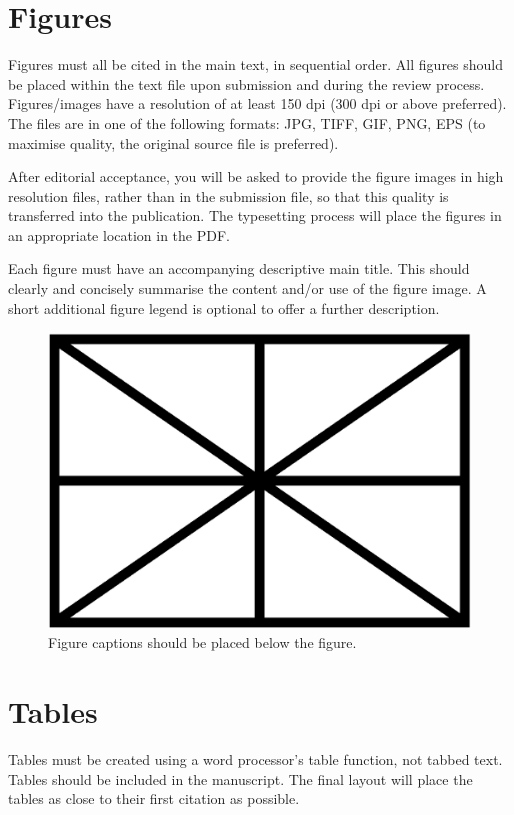 \documentclass{article}
\begin{document}
\section{Figures}\label{sec:figures}

Figures must all be cited in the main text, in sequential order.
All figures should be placed within the text file upon submission and during
the review process. Figures/images have a resolution of at least 150 dpi
(300 dpi or above preferred). The files are in one of the following formats:
JPG, TIFF, GIF, PNG, EPS (to maximise quality,
the original source file is preferred).

After editorial acceptance, you will be asked to provide the figure
images in high resolution files, rather than in the submission file,
so that this quality is transferred into the publication.
The typesetting process will place the figures in an appropriate
location in the PDF.

Each figure must have an accompanying descriptive main title.
This should clearly and concisely summarise the content and/or
use of the figure image.
A short additional figure legend is optional to offer a further description.

\begin{figure}[htbp]
  \centering
  \includegraphics[width=0.85\columnwidth]{figure}
  \caption{Figure captions should be placed below the figure.}
\label{fig:figure}
\end{figure}

\section{Tables}\label{sec:tables}

Tables must be created using a word processor's table function,
not tabbed text.
Tables should be included in the manuscript.
The final layout will place the tables as close to their first
citation as possible.
\end{document}
